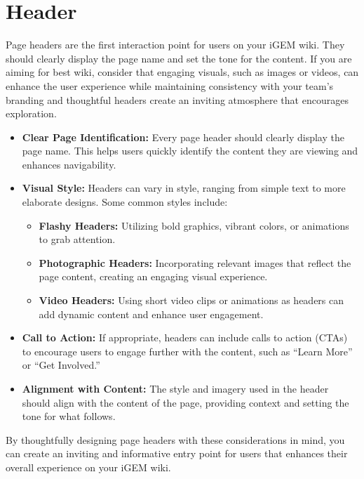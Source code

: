\section{Header} 
Page headers are the first interaction point for users on your iGEM wiki.
They should clearly display the page name and set the tone for the content.
If you are aiming for best wiki, consider that engaging visuals, such as images or videos, can enhance the user experience while maintaining consistency with your team’s branding and thoughtful headers create an inviting atmosphere that encourages exploration.


\begin{itemize}
\item \textbf{Clear Page Identification:}
Every page header should clearly display the page name.
This helps users quickly identify the content they are viewing and enhances navigability.

\item \textbf{Visual Style:}
Headers can vary in style, ranging from simple text to more elaborate designs.
Some common styles include:
\begin{itemize}
    \item \textbf{Flashy Headers:} Utilizing bold graphics, vibrant colors, or animations to grab attention.
    \item \textbf{Photographic Headers:} Incorporating relevant images that reflect the page content, creating an engaging visual experience.
    \item \textbf{Video Headers:} Using short video clips or animations as headers can add dynamic content and enhance user engagement.
\end{itemize}

\item \textbf{Call to Action:}
If appropriate, headers can include calls to action (CTAs) to encourage users to engage further with the content, such as ``Learn More'' or ``Get Involved.''

\item \textbf{Alignment with Content:}
The style and imagery used in the header should align with the content of the page, providing context and setting the tone for what follows.
\end{itemize}
By thoughtfully designing page headers with these considerations in mind, you can create an inviting and informative entry point for users that enhances their overall experience on your iGEM wiki.

